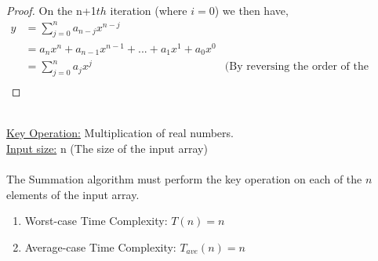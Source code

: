 \documentclass[12pt]{article}
\newenvironment{question}[2][Question]{\begin{trivlist}
\item[\hskip \labelsep {\bfseries #1}\hskip \labelsep {\bfseries #2.}]}{\end{trivlist}}
\begin{document}
\begin{question}{1. (i)}
\begin{proof}
  On the n+1$th$ iteration (where $i = 0$) we then have,
  \begin{align*}
    y & = \sum_{j=0}^{n} a_{n - j}x^{n - j}\\
      & = a_{n}x^{n} + a_{n-1}x^{n-1} + ... + a_{1}x^{1} + a_{0}x^{0}\\
      & = \sum_{j=0}^{n} a_{j}x^{j} & \text{(By reversing the order of the terms)}\\
  \end{align*}

  \end{proof}
\end{question}

\begin{question}{1. (ii)}
  \leavevmode \\
  \underline{Key Operation:} Multiplication of real numbers. \\
  \underline{Input size:} n (The size of the input array) \\ \\
  The Summation algorithm must perform the key operation on each of
  the $n$ elements of the input array.
  \begin{enumerate}
    \item Worst-case Time Complexity: $T(n) = n$
    \item Average-case Time Complexity: $T_{ave}(n) = n$
  \end{enumerate}
\end{question}
\end{document}
